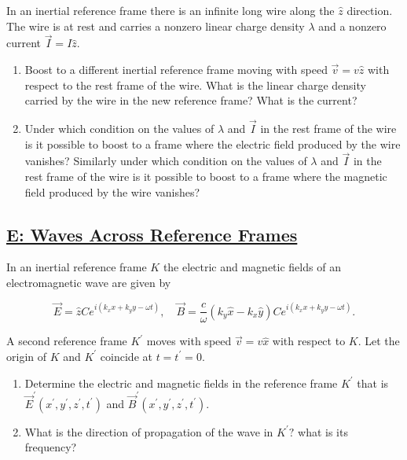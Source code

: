 In an inertial reference frame there is an infinite long wire along the $\hat{z}$ direction. The wire is at rest and carries a nonzero linear charge density $\lambda$ and a nonzero current $\vec{I}=I \hat{z}$.
\begin{enumerate}
	\item Boost to a different inertial reference frame moving with speed $\vec{v}=v \hat{z}$ with respect to
	the rest frame of the wire. What is the linear charge density carried by the wire in the new reference frame? What is the current?
	\item Under which condition on the values of $\lambda$ and $\vec{I}$ in the rest frame of the wire is it
	possible to boost to a frame where the electric field produced by the wire vanishes? Similarly under which condition on the values of $\lambda$ and $\vec{I}$ in the rest frame of the wire is it possible to boost to a frame where the magnetic field produced by the wire vanishes?
\end{enumerate}

\subsection{\hyperref[E: Waves Across Reference Frames]{E: Waves Across Reference Frames}}

In an inertial reference frame $K$ the electric and magnetic fields of an electromagnetic wave are given by

\begin{equation}
	\vec{E}=\hat{z} C e^{i\left(k_{x} x+k_{y} y-\omega t\right)}, \quad \vec{B}=\frac{c}{\omega}\left(k_{y} \hat{x}-k_{x} \hat{y}\right) C e^{i\left(k_{x} x+k_{y} y-\omega t\right)}.
\end{equation}

A second reference frame $K^{\prime}$ moves with speed $\vec{v}=v \hat{x}$ with respect to $K .$ Let the origin of
$K$ and $K^{\prime}$ coincide at $t=t^{\prime}=0$.

\begin{enumerate}
	\item Determine the electric and magnetic fields in the reference frame $K^{\prime}$ that is $\vec{E}^{\prime}\left(x^{\prime}, y^{\prime}, z^{\prime}, t^{\prime}\right)$ and $\vec{B}^{\prime}\left(x^{\prime}, y^{\prime}, z^{\prime}, t^{\prime}\right)$.
	\item What is the direction of propagation of the wave in $K^{\prime} ?$ what is its frequency?
\end{enumerate}



